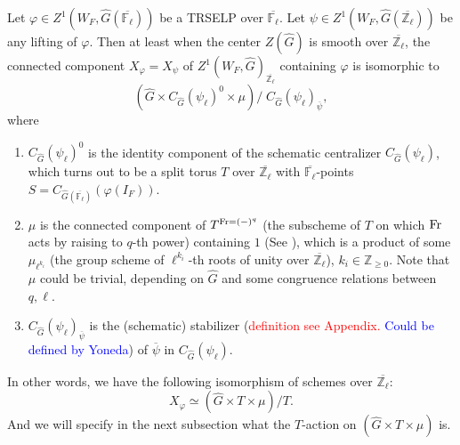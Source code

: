 \begin{theorem}\label{Thm X}
	Let $\varphi \in Z^1(W_F, \hat{G}(\overline{\mathbb{F}_{\ell}}))$ be a TRSELP over $\overline{\mathbb{F}_{\ell}}$. Let $\psi \in Z^1(W_F, \hat{G}(\overline{\mathbb{Z}_{\ell}}))$ be any lifting of $\varphi$. Then at least when the center $Z(\hat{G})$ is smooth over $\overline{\mathbb{Z}_{\ell}}$, the connected component $X_{\varphi}=X_{\psi}$ of $Z^1(W_F, \hat{G})_{\overline{\mathbb{Z}_{\ell}}}$ containing $\varphi$ is isomorphic to 
	$$\left(\hat{G} \times C_{\hat{G}}(\psi_{\ell})^0 \times \mu\right)/\;C_{\hat{G}}(\psi_{\ell})_{\overline{\psi}},$$
	where
	\begin{enumerate}
		\item $C_{\hat{G}}(\psi_{\ell})^0$ is the identity component of the schematic centralizer $C_{\hat{G}}(\psi_{\ell})$, which turns out to be a split torus $T$ over $\overline{\mathbb{Z}_{\ell}}$ with $\overline{\mathbb{F}_{\ell}}$-points $S=C_{\hat{G}(\overline{\mathbb{F}_{\ell}})}(\varphi(I_F))$.
		\item $\mu$ is the connected component of $T^{\operatorname{Fr}=(-)^q}$ (the subscheme of $T$ on which $\operatorname{Fr}$ acts by raising to $q$-th power) containing $1$ (See \cite[Example 3.14]{dat2022ihes}), which is a product of some $\mu_{\ell^{k_i}}$ (the group scheme of $\ell^{k_i}$-th roots of unity over $\overline{\mathbb{Z}_{\ell}}$), $k_i \in \mathbb{Z}_{\geq 0}$. Note that $\mu$ could be trivial, depending on $\hat{G}$ and some congruence relations between $q, \ell$.
		\item $C_{\hat{G}}(\psi_{\ell})_{\overline{\psi}}$ is the (schematic) stabilizer (\textcolor{red}{definition see Appendix.} \textcolor{blue}{Could be defined by Yoneda}) of $\overline{\psi}$ in $C_{\hat{G}}(\psi_{\ell})$.
	\end{enumerate}
    In other words, we have the following isomorphism of schemes over $\overline{\mathbb{Z}_{\ell}}$:
    $$X_{\varphi} \simeq \left(\hat{G} \times T \times \mu\right)/T.$$
    And we will specify in the next subsection what the $T$-action on $\left(\hat{G} \times T \times \mu\right)$ is.
    

\end{theorem}
